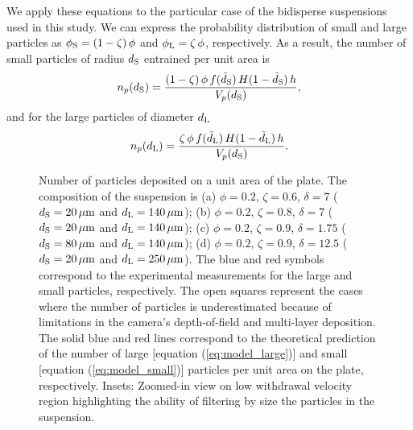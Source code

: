 \documentclass{jfm}
\begin{document}
We apply these equations to the particular case of the bidisperse suspensions used in this study. We can express the probability distribution of small and large particles as $\phi_{\rm S}=(1-\zeta)\,\phi$ and $\phi_{\rm L}=\zeta\,\phi$, respectively. As a result, the number of small particles of radius $d_{\rm S}$ entrained per unit area is
\begin{equation}\label{eq:model_large}
n_{p}(d_{\rm S})=\frac{(1-\zeta)\,\phi\, f(\tilde{d}_{\rm S}) \,H(1- \tilde{d}_{\rm S})\,h}{V_{p}(d_{\rm S})},
\end{equation}
and for the large particles of diameter $d_{\rm L}$
\begin{equation}\label{eq:model_small}
n_{p}(d_{\rm L})=\frac{\zeta\,\phi\, f(\tilde{d}_{\rm L}) \,H(1- \tilde{d}_{\rm L})\,h}{V_{p}(d_{\rm S})}.
\end{equation}


\begin{figure}
\centering
{}
  \caption{Number of particles deposited on a unit area of the plate.
      The composition of the suspension is 
      (a) $\phi=0.2$, $\zeta=0.6$, $\delta=7$ 
      ($d_{\rm S}=20\,\mu{\rm m}$ and $d_{\rm L}=140\,\mu{\rm m}$); 
      (b) $\phi=0.2$, $\zeta=0.8$, $\delta=7$ 
      ($d_{\rm S}=20\,\mu{\rm m}$ and $d_{\rm L}=140\,\mu{\rm m}$); 
      (c) $\phi=0.2$, $\zeta=0.9$, $\delta=1.75$ 
      ($d_{\rm S}=80\,\mu{\rm m}$ and $d_{\rm L}=140\,\mu{\rm m}$); 
      (d) $\phi=0.2$, $\zeta=0.9$, $\delta=12.5$ 
      ($d_{\rm S}=20\,\mu{\rm m}$ and $d_{\rm L}=250\,\mu{\rm m}$).
      The blue and red symbols correspond to the experimental measurements for the large and small particles, respectively.
      The open squares represent the cases where the number of particles is underestimated because of limitations in the camera's depth-of-field and multi-layer deposition.
      The solid blue and red lines correspond to the theoretical prediction of the number of large
      [equation (\ref{eq:model_large})] and small [equation (\ref{eq:model_small})] particles per unit area on the plate, respectively.
      Insets: Zoomed-in view on low withdrawal velocity region highlighting the ability of filtering by size the particles in the suspension.
  }
  \label{fgr:Figure_9}
\end{figure}
\end{document}
